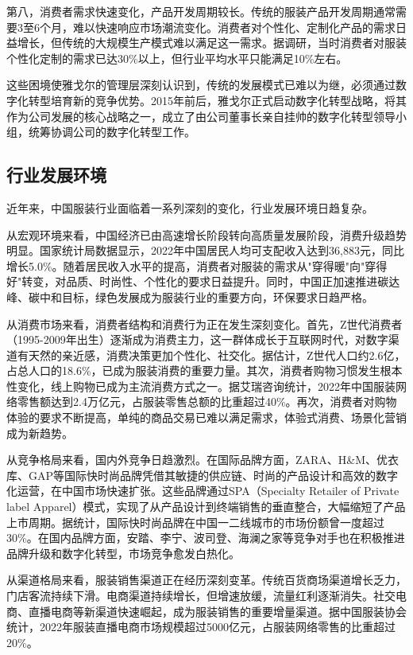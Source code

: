 \documentclass[12pt,a4paper]{article}
\begin{document}
第八，消费者需求快速变化，产品开发周期较长。传统的服装产品开发周期通常需要3至6个月，难以快速响应市场潮流变化。消费者对个性化、定制化产品的需求日益增长，但传统的大规模生产模式难以满足这一需求。据调研，当时消费者对服装个性化定制的需求已达30\%以上，但行业平均水平只能满足10\%左右。

这些困境使雅戈尔的管理层深刻认识到，传统的发展模式已难以为继，必须通过数字化转型培育新的竞争优势。2015年前后，雅戈尔正式启动数字化转型战略，将其作为公司发展的核心战略之一，成立了由公司董事长亲自挂帅的数字化转型领导小组，统筹协调公司的数字化转型工作。

\subsection{行业发展环境}

近年来，中国服装行业面临着一系列深刻的变化，行业发展环境日趋复杂。

从宏观环境来看，中国经济已由高速增长阶段转向高质量发展阶段，消费升级趋势明显。国家统计局数据显示，2022年中国居民人均可支配收入达到36,883元，同比增长5.0\%。随着居民收入水平的提高，消费者对服装的需求从"穿得暖"向"穿得好"转变，对品质、时尚性、个性化的要求日益提升。同时，中国正加速推进碳达峰、碳中和目标，绿色发展成为服装行业的重要方向，环保要求日趋严格。

从消费市场来看，消费者结构和消费行为正在发生深刻变化。首先，Z世代消费者（1995-2009年出生）逐渐成为消费主力，这一群体成长于互联网时代，对数字渠道有天然的亲近感，消费决策更加个性化、社交化。据估计，Z世代人口约2.6亿，占总人口的18.6\%，已成为服装消费的重要力量。其次，消费者购物习惯发生根本性变化，线上购物已成为主流消费方式之一。据艾瑞咨询统计，2022年中国服装网络零售额达到2.4万亿元，占服装零售总额的比重超过40\%。再次，消费者对购物体验的要求不断提高，单纯的商品交易已难以满足需求，体验式消费、场景化营销成为新趋势。

从竞争格局来看，国内外竞争日趋激烈。在国际品牌方面，ZARA、H\&M、优衣库、GAP等国际快时尚品牌凭借其敏捷的供应链、时尚的产品设计和高效的数字化运营，在中国市场快速扩张。这些品牌通过SPA（Specialty Retailer of Private label Apparel）模式，实现了从产品设计到终端销售的垂直整合，大幅缩短了产品上市周期。据统计，国际快时尚品牌在中国一二线城市的市场份额曾一度超过30\%。在国内品牌方面，安踏、李宁、波司登、海澜之家等竞争对手也在积极推进品牌升级和数字化转型，市场竞争愈发白热化。

从渠道格局来看，服装销售渠道正在经历深刻变革。传统百货商场渠道增长乏力，门店客流持续下滑。电商渠道持续增长，但增速放缓，流量红利逐渐消失。社交电商、直播电商等新渠道快速崛起，成为服装销售的重要增量渠道。据中国服装协会统计，2022年服装直播电商市场规模超过5000亿元，占服装网络零售的比重超过20\%。
\end{document}
